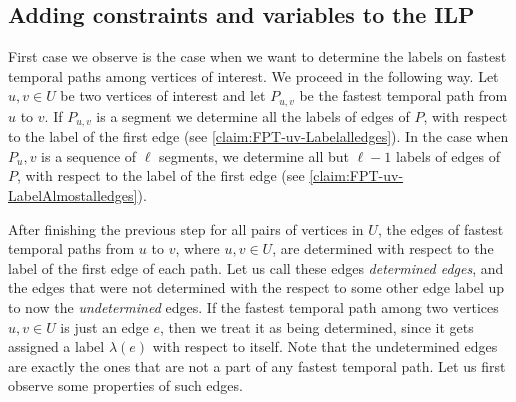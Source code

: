 \documentclass[11pt,a4paper]{article}
\theoremstyle{remark}
\theoremstyle{definition}
\begin{document}
\subsection{Adding constraints and variables to the ILP}
First case we observe is the case when we want to determine the labels on fastest temporal paths among vertices of interest.
We proceed in the following way.
Let $u,v \in U$ be two vertices of interest and let $P_{u,v}$ be the fastest temporal path from $u$ to $v$.
If $P_{u,v}$ is a segment we determine all the labels of edges of $P$, with respect to the label of the first edge (see \cref{claim:FPT-uv-Labelalledges}).
In the case when $P{_u,v}$ is a sequence of $\ell$ segments, we determine all but $\ell - 1$ labels of edges of $P$, with respect to the label of the first edge (see \cref{claim:FPT-uv-LabelAlmostalledges}).

After finishing the previous step for all pairs of vertices in $U$,
the edges of fastest temporal paths from $u$ to $v$, where $u,v \in U$, are determined with respect to the label of the first edge of each path.
Let us call these edges \emph{determined edges}, and the edges that were not determined with the respect to some other edge label up to now the \emph{undetermined} edges.
If the fastest temporal path among two vertices $u,v \in U$ is just an edge $e$, then we treat it as being determined, since it gets assigned a label $\lambda(e)$ with respect to itself.
Note that the undetermined edges are exactly the ones that are not a part of any fastest temporal path.
Let us first observe some properties of such edges.
\end{document}
